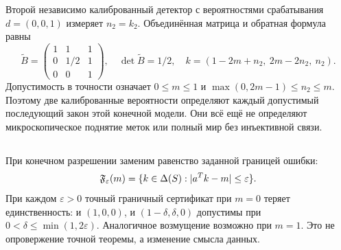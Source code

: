 {Второй независимо калиброванный детектор с вероятностями срабатывания $d=(0,0,1)$ измеряет $n_2=k_2$. Объединённая матрица и обратная формула равны}
\begin{equation}\label{eq:second}
 \widetilde B=\begin{pmatrix}1&1&1\\0&1/2&1\\0&0&1\end{pmatrix},\quad
 \det\widetilde B=1/2,\quad
 k=(1-2m+n_2,\ 2m-2n_2,\ n_2).
\end{equation}
{Допустимость в точности означает $0\leq m\leq1$ и $\max(0,2m-1)\leq n_2\leq m$. Поэтому две калиброванные вероятности определяют каждый допустимый последующий закон этой конечной модели. Они всё ещё не определяют микроскопическое поднятие меток или полный мир без инъективной связи.}

\subsection{}
{При конечном разрешении заменим равенство заданной границей ошибки:}
\begin{equation}\label{eq:resolution}
 \mathfrak F_\varepsilon(m)=\{k\in\Delta(S):|a^Tk-m|\leq\varepsilon\}.
\end{equation}
{При каждом $\varepsilon>0$ точный граничный сертификат при $m=0$ теряет единственность: и $(1,0,0)$, и $(1-\delta,\delta,0)$ допустимы при $0<\delta\leq\min(1,2\varepsilon)$. Аналогичное возмущение возможно при $m=1$. Это не опровержение точной теоремы, а изменение смысла данных.}

